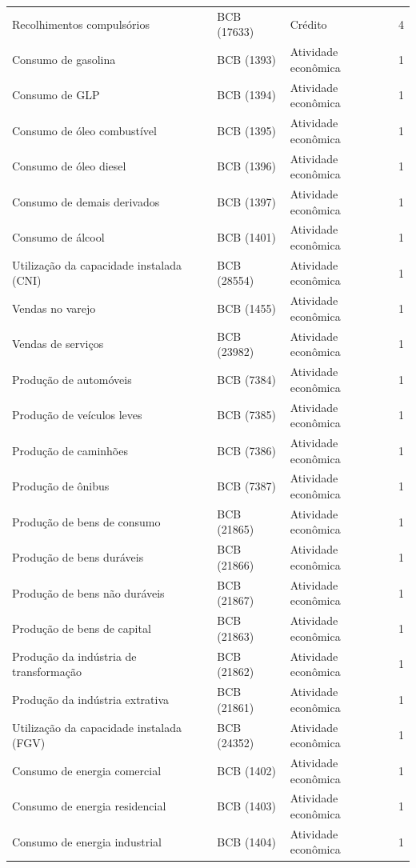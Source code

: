 \documentclass[preprint,authoryear,review,12pt]{elsarticle}
\begin{document}
\begin{ThreePartTable}
\begin{longtable}{@{}p{5.2cm} l l c@{}}
Recolhimentos compulsórios & BCB (17633) & Crédito & 4 \\
Consumo de gasolina & BCB (1393) & Atividade econômica & 1 \\
Consumo de GLP & BCB (1394) & Atividade econômica & 1 \\
Consumo de óleo combustível & BCB (1395) & Atividade econômica & 1 \\
Consumo de óleo diesel & BCB (1396) & Atividade econômica & 1 \\
Consumo de demais derivados & BCB (1397) & Atividade econômica & 1 \\
Consumo de álcool & BCB (1401) & Atividade econômica & 1 \\
Utilização da capacidade instalada (CNI) & BCB (28554) & Atividade econômica & 1 \\
Vendas no varejo & BCB (1455) & Atividade econômica & 1 \\
Vendas de serviços & BCB (23982) & Atividade econômica & 1 \\
Produção de automóveis & BCB (7384) & Atividade econômica & 1 \\
Produção de veículos leves & BCB (7385) & Atividade econômica & 1 \\
Produção de caminhões & BCB (7386) & Atividade econômica & 1 \\
Produção de ônibus & BCB (7387) & Atividade econômica & 1 \\
Produção de bens de consumo & BCB (21865) & Atividade econômica & 1 \\
Produção de bens duráveis & BCB (21866) & Atividade econômica & 1 \\
Produção de bens não duráveis & BCB (21867) & Atividade econômica & 1 \\
Produção de bens de capital & BCB (21863) & Atividade econômica & 1 \\
Produção da indústria de transformação & BCB (21862) & Atividade econômica & 1 \\
Produção da indústria extrativa & BCB (21861) & Atividade econômica & 1 \\
Utilização da capacidade instalada (FGV) & BCB (24352) & Atividade econômica & 1 \\
Consumo de energia comercial & BCB (1402) & Atividade econômica & 1 \\
Consumo de energia residencial & BCB (1403) & Atividade econômica & 1 \\
Consumo de energia industrial & BCB (1404) & Atividade econômica & 1 \\

\end{longtable}
\end{ThreePartTable}
\end{document}
